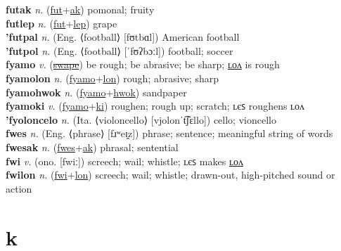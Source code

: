 \textbf{futak} \textit{n.} (\hyperref[fut]{fut}+\hyperref[ak]{ak})
pomonal; fruity \label{futak} \\
\textbf{futlep} \textit{n.} (\hyperref[fut]{fut}+\hyperref[lep]{lep})
grape \label{futlep} \\
\textbf{'futpal} \textit{n.} (Eng. ⟨football⟩ [fʊtbɑl])
American football \label{'futpal} \\
\textbf{'futpol} \textit{n.} (Eng. ⟨football⟩ [ˈfʊʔbɔːl])
football; soccer \label{'futpol} \\
\textbf{fyamo} \textit{v.} (\hyperref[swape]{\sout{swape}})
be rough; be abrasive; be sharp; \hyperref[fyamolon]{ʟᴏᴧ} is rough \label{fyamo} \\
\textbf{fyamolon} \textit{n.} (\hyperref[fyamo]{fyamo}+\hyperref[lon]{lon})
rough; abrasive; sharp \label{fyamolon} \\
\textbf{fyamohwok} \textit{n.} (\hyperref[fyamo]{fyamo}+\hyperref[hwok]{hwok})
sandpaper \label{fyamohwok} \\
\textbf{fyamoki} \textit{v.} (\hyperref[fyamo]{fyamo}+\hyperref[ki]{ki})
roughen; rough up; scratch; ʟєꜱ roughens ʟᴏᴧ \label{fyamoki} \\
\textbf{'fyoloncelo} \textit{n.} (Ita. ⟨violoncello⟩ [vjolonˈt͡ʃɛllo])
cello; vioncello \label{'fyoloncelo} \\
\textbf{fwes} \textit{n.} (Eng. ⟨phrase⟩ [fɹʷeɪ̯z])
phrase; sentence; meaningful string of words \label{fwes} \\
\textbf{fwesak} \textit{n.} (\hyperref[fwes]{fwes}+\hyperref[ak]{ak})
phrasal; sentential \label{fwesak} \\
\textbf{fwi} \textit{v.} (ono. [fwiː])
screech; wail; whistle; ʟєꜱ makes \hyperref[fwilon]{ʟᴏᴧ} \label{fwi} \\
\textbf{fwilon} \textit{n.} (\hyperref[fwi]{fwi}+\hyperref[lon]{lon})
screech; wail; whistle; drawn-out, high-pitched sound or action \label{fwilon} 

\section{k}

